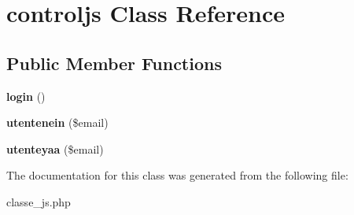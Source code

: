 \hypertarget{classcontroljs}{\section{controljs Class Reference}
\label{classcontroljs}
}
\subsection*{Public Member Functions}
\begin{DoxyCompactItemize}
\item 
\hypertarget{classcontroljs_a143299a4f92ff471ca04e95a3ce1f395}{{\bfseries login} ()}\label{classcontroljs_a143299a4f92ff471ca04e95a3ce1f395}

\item 
\hypertarget{classcontroljs_aa1c521c961b2d8c7bb8acc5b84f5d199}{{\bfseries utentenein} (\$email)}\label{classcontroljs_aa1c521c961b2d8c7bb8acc5b84f5d199}

\item 
\hypertarget{classcontroljs_aaea7ff20420b5aba604bf771ac31af88}{{\bfseries utenteyaa} (\$email)}\label{classcontroljs_aaea7ff20420b5aba604bf771ac31af88}

\end{DoxyCompactItemize}


The documentation for this class was generated from the following file\-:\begin{DoxyCompactItemize}
\item 
classe\-\_\-js.\-php\end{DoxyCompactItemize}
